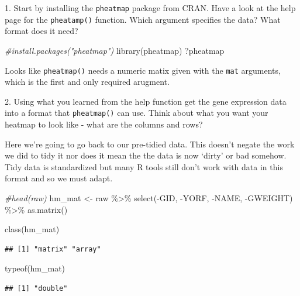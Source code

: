 \documentclass[
]{book}
\newenvironment{Shaded}{\begin{snugshade}}{\end{snugshade}}
\newcommand{\CommentTok}[1]{\textcolor[rgb]{0.56,0.35,0.01}{\textit{#1}}}
\newcommand{\FunctionTok}[1]{\textcolor[rgb]{0.00,0.00,0.00}{#1}}
\newcommand{\NormalTok}[1]{#1}
\newcommand{\OtherTok}[1]{\textcolor[rgb]{0.56,0.35,0.01}{#1}}
\newcommand{\SpecialCharTok}[1]{\textcolor[rgb]{0.00,0.00,0.00}{#1}}
\begin{document}
1. Start by installing the \texttt{pheatmap} package from CRAN. Have a look at the help page for the \texttt{pheatamp()} function. Which argument specifies the data? What format does it need?

\begin{Shaded}
\begin{Highlighting}[]
\CommentTok{\#install.packages("pheatmap")}
\FunctionTok{library}\NormalTok{(pheatmap)}
\NormalTok{?pheatmap}
\end{Highlighting}
\end{Shaded}

Looks like \texttt{pheatmap()} needs a numeric matix given with the \texttt{mat} arguments, which is the first and only required arugment.

2. Using what you learned from the help function get the gene expression data into a format that \texttt{pheatmap()} can use. Think about what you want your heatmap to look like - what are the columns and rows?

Here we're going to go back to our pre-tidied data. This doesn't negate the work we did to tidy it nor does it mean the the data is now `dirty' or bad somehow. Tidy data is standardized but many R tools still don't work with data in this format and so we must adapt.

\begin{Shaded}
\begin{Highlighting}[]
\CommentTok{\#head(raw)}
\NormalTok{hm\_mat }\OtherTok{\textless{}{-}}\NormalTok{ raw }\SpecialCharTok{\%\textgreater{}\%}
  \FunctionTok{select}\NormalTok{(}\SpecialCharTok{{-}}\NormalTok{GID, }\SpecialCharTok{{-}}\NormalTok{YORF, }\SpecialCharTok{{-}}\NormalTok{NAME, }\SpecialCharTok{{-}}\NormalTok{GWEIGHT) }\SpecialCharTok{\%\textgreater{}\%}
  \FunctionTok{as.matrix}\NormalTok{()}

\FunctionTok{class}\NormalTok{(hm\_mat)}
\end{Highlighting}
\end{Shaded}

\begin{verbatim}
## [1] "matrix" "array"
\end{verbatim}

\begin{Shaded}
\begin{Highlighting}[]
\FunctionTok{typeof}\NormalTok{(hm\_mat)}
\end{Highlighting}
\end{Shaded}

\begin{verbatim}
## [1] "double"
\end{verbatim}
\end{document}
